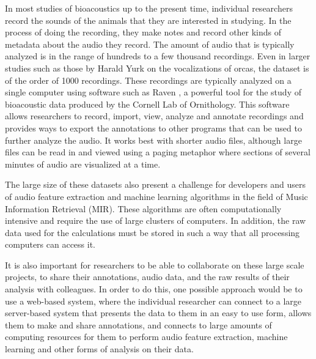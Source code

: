 In most studies of bioacoustics up to the present time, individual
researchers record the sounds of the animals that they are interested
in studying.  In the process of doing the recording, they make notes
and record other kinds of metadata about the audio they record.  The
amount of audio that is typically analyzed is in the range of hundreds
to a few thousand recordings.  Even in larger studies such as those by
Harald Yurk \cite{yurk2002cultural} on the vocalizations of orcas, the dataset is of the order
of 1000 recordings.  These recordings are typically analyzed on a
single computer using software such as Raven \cite{cornell2011raven}, a
powerful tool for the study of bioacoustic data produced by the
Cornell Lab of Ornithology.  This software allows researchers to
record, import, view, analyze and annotate recordings and provides
ways to export the annotations to other programs that can be used to
further analyze the audio.  It works best with shorter audio files,
although large files can be read in and viewed using a paging
metaphor where sections of several minutes of audio are visualized at
a time.

The large size of these datasets also present a challenge for
developers and users of audio feature extraction and machine learning
algorithms in the field of Music Information Retrieval (MIR).  These
algorithms are often computationally intensive and require the use of
large clusters of computers.  In addition, the raw data used for the
calculations must be stored in such a way that all processing
computers can access it.

It is also important for researchers to be able to collaborate on
these large scale projects, to share their annotations, audio data,
and the raw results of their analysis with colleagues.  In order to do
this, one possible approach would be to use a web-based system, where
the individual researcher can connect to a large server-based system
that presents the data to them in an easy to use form, allows them to
make and share annotations, and connects to large amounts of computing
resources for them to perform audio feature extraction, machine
learning and other forms of analysis on their data.
 
